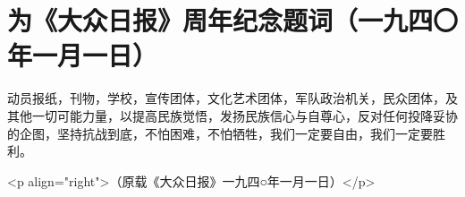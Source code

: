 \section[为《大众日报》周年纪念题词（一九四〇年一月一日）]{为《大众日报》周年纪念题词（一九四〇年一月一日）}


动员报纸，刊物，学校，宣传团体，文化艺术团体，军队政治机关，民众团体，及其他一切可能力量，以提高民族觉悟，发扬民族信心与自尊心，反对任何投降妥协的企图，坚持抗战到底，不怕困难，不怕牺牲，我们一定要自由，我们一定要胜利。

<p align="right">（原载《大众日报》一九四○年一月一日）</p>

